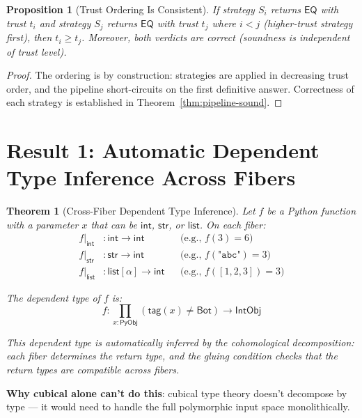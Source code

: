 \documentclass[11pt,a4paper]{report}
\theoremstyle{definition}
\theoremstyle{plain}
\newtheorem{theorem}[definition]{Theorem}
\newtheorem{proposition}[definition]{Proposition}
\newcommand{\PyObj}{\mathsf{PyObj}}
\begin{document}
\begin{proposition}[Trust Ordering Is Consistent]
If strategy $S_i$ returns $\mathsf{EQ}$ with trust $t_i$ and
strategy $S_j$ returns $\mathsf{EQ}$ with trust $t_j$ where
$i < j$ (higher-trust strategy first), then $t_i \geq t_j$.
Moreover, both verdicts are correct (soundness is independent of
trust level).
\end{proposition}

\begin{proof}
The ordering is by construction: strategies are applied in decreasing
trust order, and the pipeline short-circuits on the first definitive
answer.  Correctness of each strategy is established in
Theorem~\ref{thm:pipeline-sound}.
\end{proof}

\section{Result 1: Automatic Dependent Type Inference Across Fibers}

\begin{theorem}[Cross-Fiber Dependent Type Inference]
\label{thm:cross-fiber}
Let $f$ be a Python function with a parameter $x$ that can be
$\mathsf{int}$, $\mathsf{str}$, or $\mathsf{list}$.  On each fiber:
\begin{align}
  f|_\mathsf{int} &: \mathsf{int} \to \mathsf{int}
    && \text{(e.g., $f(3) = 6$)} \\
  f|_\mathsf{str} &: \mathsf{str} \to \mathsf{int}
    && \text{(e.g., $f(\texttt{"abc"}) = 3$)} \\
  f|_\mathsf{list} &: \mathsf{list}[\alpha] \to \mathsf{int}
    && \text{(e.g., $f([1,2,3]) = 3$)}
\end{align}

The \emph{dependent type} of $f$ is:
\[
  f : \prod_{x : \PyObj} (\mathsf{tag}(x) \neq \mathsf{Bot}) \to
  \mathsf{IntObj}
\]

This dependent type is \emph{automatically inferred} by the
cohomological decomposition: each fiber determines the return type,
and the gluing condition checks that the return types are compatible
across fibers.
\end{theorem}

\textbf{Why cubical alone can't do this}: cubical type theory doesn't
decompose by type --- it would need to handle the full polymorphic
input space monolithically.
\end{document}
